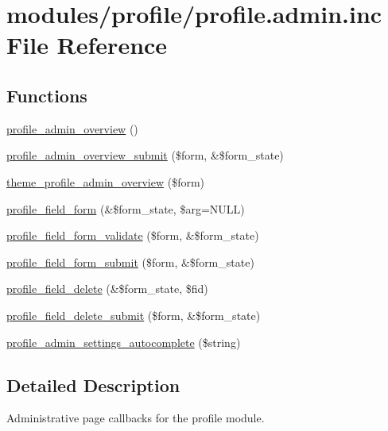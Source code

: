 \hypertarget{profile_8admin_8inc}{
\section{modules/profile/profile.admin.inc File Reference}
\label{profile_8admin_8inc}
}
\subsection*{Functions}
\begin{CompactItemize}
\item 
\hyperlink{group__forms_gf5de7da6a31a83a313aa279ec696e82c}{profile\_\-admin\_\-overview} ()
\item 
\hyperlink{profile_8admin_8inc_010af3295f669ceac61a1da0f8d5ad53}{profile\_\-admin\_\-overview\_\-submit} (\$form, \&\$form\_\-state)
\item 
\hyperlink{group__themeable_g66e427cb630bfec91b54a2f686d68aa4}{theme\_\-profile\_\-admin\_\-overview} (\$form)
\item 
\hyperlink{group__forms_g48b4a6628f7c40544ce7656a61eb6f69}{profile\_\-field\_\-form} (\&\$form\_\-state, \$arg=NULL)
\item 
\hyperlink{profile_8admin_8inc_68cc1dfe2c4f0e0946ede9786b4554e2}{profile\_\-field\_\-form\_\-validate} (\$form, \&\$form\_\-state)
\item 
\hyperlink{profile_8admin_8inc_25efcaa4c4b8e9dc9568622ad0ab3411}{profile\_\-field\_\-form\_\-submit} (\$form, \&\$form\_\-state)
\item 
\hyperlink{profile_8admin_8inc_6f272a26ed8740d2674718fc5f605c0c}{profile\_\-field\_\-delete} (\&\$form\_\-state, \$fid)
\item 
\hyperlink{profile_8admin_8inc_4b5d228dbc4ee4a3091c72b8d4530f38}{profile\_\-field\_\-delete\_\-submit} (\$form, \&\$form\_\-state)
\item 
\hyperlink{profile_8admin_8inc_2952c7f0dfb428dfdf77d7be37b707ad}{profile\_\-admin\_\-settings\_\-autocomplete} (\$string)
\end{CompactItemize}


\subsection{Detailed Description}
Administrative page callbacks for the profile module. 

